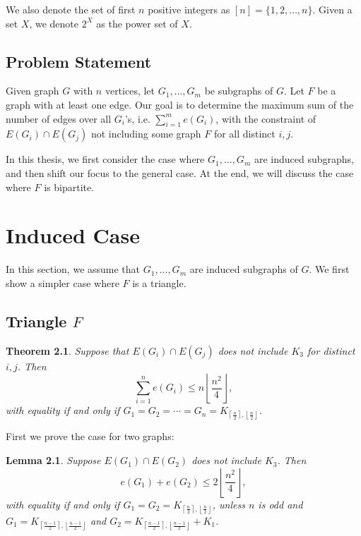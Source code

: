 \documentclass[12pt]{report}
\newtheorem{theorem}{Theorem}[chapter]
\newtheorem{lemma}{Lemma}[theorem]
\begin{document}
We also denote the set of first $n$ positive integers as $[n] = \{1, 2, \ldots, n\}$. Given a set
$X$, we denote $2^X$ as the power set of $X$.

\section{Problem Statement}

Given graph $G$ with $n$ vertices, let $G_1, \ldots, G_m$ be subgraphs of $G$. Let $F$ be a graph
with at least one edge. Our goal is to determine the maximum sum of the number of edges over all
$G_i$'s, i.e. $\sum_{i = 1}^m e(G_i)$, with the constraint of $E(G_i) \cap E(G_j)$ not including
some graph $F$ for all distinct $i, j$. 

In this thesis, we first consider the case where $G_1, \ldots, G_m$ are induced subgraphs, and then
shift our focus to the general case. At the end, we will discuss the case where $F$ is bipartite.

\chapter{Induced Case}

In this section, we assume that $G_1, \ldots, G_m$ are induced subgraphs of $G$. We first show a
simpler case where $F$ is a triangle.

\section{Triangle $F$}

\begin{theorem}
  Suppose that $E(G_i) \cap E(G_j)$ does not include $K_3$ for distinct $i, j$. Then
  \[
    \sum_{i = 1}^n e(G_i) \leq n\left\lfloor\frac{n^2}{4}\right\rfloor,
  \]
  with equality if and only if $G_1 = G_2 = \cdots = G_n = K_{\left\lceil\frac{n}{2}\right\rceil,
  \left\lfloor\frac{n}{2}\right\rfloor}$.
\end{theorem}

First we prove the case for two graphs:

\begin{lemma}
  Suppose $E(G_1) \cap E(G_2)$ does not include $K_3$. Then
  \[
    e(G_1) + e(G_2) \leq 2\left\lfloor\frac{n^2}{4}\right\rfloor,
  \]
  with equality if and only if $G_1 = G_2 = K_{\left\lceil\frac{n}{2}\right\rceil,
  \left\lfloor\frac{n}{2}\right\rfloor}$, unless $n$ is odd and $G_1 = K_{\left\lceil\frac{n -
  1}{2}\right\rceil, \left\lfloor\frac{n - 1}{2}\right\rfloor}$ and $G_2 = K_{\left\lceil\frac{n -
  1}{2}\right\rceil, \left\lfloor\frac{n - 1}{2}\right\rfloor} + K_1$.
\end{lemma}
\end{document}
